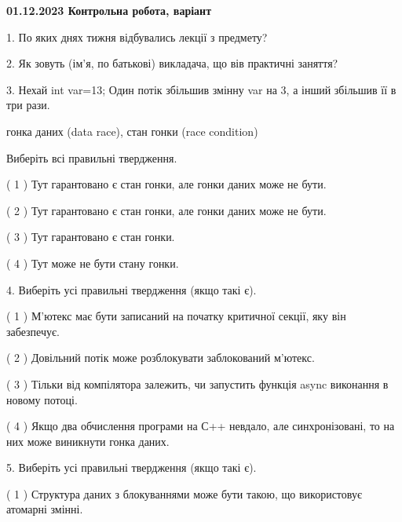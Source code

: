 \documentclass[12pt, ukrainian]{article}
\begin{document}
\vspace{4mm}
\newpage
\begin {large}

\textbf{01.12.2023 Контрольна робота, варіант  }\par


{
1. По яких днях тижня відбувались лекції з предмету?



\vspace{5mm}
2. Як зовуть (ім'я, по батькові) викладача, що вів практичні заняття?



\vspace{5mm}
3. Нехай int var=13; Один потік збільшив змінну var на 3, а інший збільшив її в три рази.

гонка даних (data race), стан гонки (race condition)

Виберіть всі правильні твердження.\par
\vspace{2mm}
( 1 ) Тут гарантовано є стан гонки, але гонки даних може не бути.%

( 2 ) Тут гарантовано є стан гонки, але гонки даних може не бути.%

( 3 ) Тут гарантовано є стан гонки.%

( 4 ) Тут може не бути стану гонки.%


\vspace{5mm}
4. Виберіть усі правильні твердження (якщо такі є).\par
\vspace{2mm}

( 1 ) М’ютекс має бути записаний на початку критичної секції, яку він забезпечує.%

( 2 ) Довільний потік може розблокувати заблокований м’ютекс.%

( 3 ) Тільки від компілятора залежить, чи запустить функція async виконання в новому потоці.%

( 4 ) Якщо два обчислення програми на С++ невдало, але синхронізовані, то на них може виникнути гонка даних.%


\vspace{5mm}
5. Виберіть усі правильні твердження (якщо такі є).\par
\vspace{2mm}

( 1 ) Структура даних з блокуваннями може бути такою, що використовує атомарні змінні.%

}
\end{large}
\end{document}
